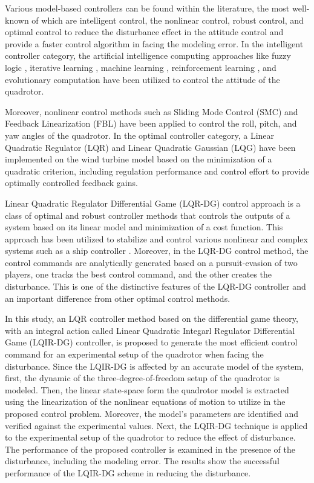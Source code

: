 \documentclass[conference]{IEEEtran}
\begin{document}
     Various model-based controllers can be found within the literature, the most well-known of which are intelligent control, the nonlinear control, robust control, and optimal control to reduce the disturbance effect in the attitude control and provide a faster control algorithm in facing the modeling error. In the intelligent controller category, the artificial intelligence computing approaches like fuzzy logic \cite{fuzzy}, iterative learning \cite{iterative_Learning}, machine learning \cite{machine_learning}, reinforcement learning \cite{Reinforcement_Learning}, and evolutionary computation \cite{Evolutionary} have been utilized to control the attitude of the quadrotor.


     Moreover, nonlinear control methods such as Sliding Mode Control (SMC) \cite{SMC} and Feedback Linearization (FBL) \cite{FBL} have been applied to control the roll, pitch, and yaw angles of the quadrotor. In the optimal controller category, a Linear Quadratic Regulator (LQR) \cite{LQR} and Linear Quadratic Gaussian (LQG) \cite{LQG} have been implemented on the wind turbine model based on the minimization of a quadratic criterion, including regulation performance and control effort to provide optimally controlled feedback gains. 


     Linear Quadratic Regulator Differential Game (LQR-DG) control approach \cite{LQDG, robust_LQDG} is a class of optimal and robust controller methods that controls the outputs of a system based on its linear model and minimization of a cost function. This approach has been utilized to stabilize and control various nonlinear and complex systems such as a ship controller \cite{LQDG_ship}. Moreover, in the LQR-DG control method, the control commands are analytically generated based on a pursuit-evasion of two players, one tracks the best control command, and the other creates the disturbance. This is one of the distinctive features of the LQR-DG controller and an important difference from other optimal control methods.


     In this study, an LQR controller method based on the differential game theory, with an integral action called Linear Quadratic Integarl Regulator Differential Game (LQIR-DG) controller, is proposed to generate the most efficient control command for an experimental setup of the quadrotor when facing the disturbance. Since the LQIR-DG is affected by an accurate model of the system, first, the dynamic of the three-degree-of-freedom setup of the quadrotor is modeled. Then, the linear state-space form the quadrotor model is extracted using the linearization of the nonlinear equations of motion to utilize in the proposed control problem. Moreover, the model's parameters are identified and verified against the experimental values. Next, the LQIR-DG technique is applied to the experimental setup of the quadrotor to reduce the effect of disturbance. The performance of the proposed controller is examined in the presence of the disturbance, including the modeling error. The results show the successful performance of the LQIR-DG scheme in reducing the disturbance.
\end{document}
